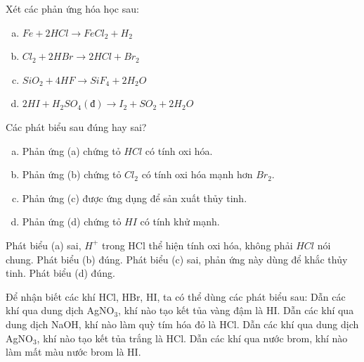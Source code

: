\documentclass[Main.tex]{subfiles}
\begin{document}
    \begin{ex}
        Xét các phản ứng hóa học sau:
        \begin{enumerate}[(a)]
            \item $Fe + 2HCl \rightarrow FeCl_2 + H_2$
            \item $Cl_2 + 2HBr \rightarrow 2HCl + Br_2$
            \item $SiO_2 + 4HF \rightarrow SiF_4 + 2H_2O$
            \item $2HI + H_2SO_4 (đ) \rightarrow I_2 + SO_2 + 2H_2O$
        \end{enumerate}
        Các phát biểu sau đúng hay sai?
        \begin{enumerate}[(a)]
            \item Phản ứng (a) chứng tỏ $HCl$ có tính oxi hóa.
            \item Phản ứng (b) chứng tỏ $Cl_2$ có tính oxi hóa mạnh hơn $Br_2$.
            \item Phản ứng (c) được ứng dụng để sản xuất thủy tinh.
            \item Phản ứng (d) chứng tỏ $HI$ có tính khử mạnh.
        \end{enumerate}
        \choiceTF
        {Phát biểu (a) sai, $H^+$ trong HCl thể hiện tính oxi hóa, không phải $HCl$ nói chung.}
        {\True Phát biểu (b) đúng.}
        {Phát biểu (c) sai, phản ứng này dùng để khắc thủy tinh.}
        {\True Phát biểu (d) đúng.}
    \end{ex}
\begin{ex}
    Để nhận biết các khí HCl, HBr, HI, ta có thể dùng các phát biểu sau:
    \choiceTF
    {\True Dẫn các khí qua dung dịch AgNO$_3$, khí nào tạo kết tủa vàng đậm là HI.}
    {Dẫn các khí qua dung dịch NaOH, khí nào làm quỳ tím hóa đỏ là HCl.}
    {\True Dẫn các khí qua dung dịch AgNO$_3$, khí nào tạo kết tủa trắng là HCl.}
    {Dẫn các khí qua nước brom, khí nào làm mất màu nước brom là HI.}
    \end{ex}
    
\end{document}
